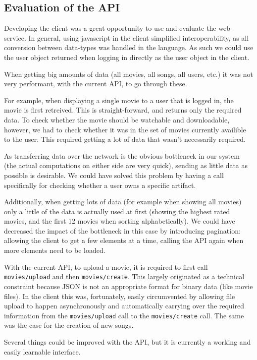 \subsection{Evaluation of the API}
\label{sec:evalapi}

Developing the client was a great opportunity to use and evaluate the web service. In general, using
javascript in the client simplified interoperability, as all conversion between data-types was handled
in the language. As such we could use the user object returned when logging in directly as the user
object in the client.

When getting big amounts of data (all movies, all songs, all users, etc.) it was not very performant,
with the current API, to go through these.

For example, when displaying a single movie to a user that
is logged in, the movie is first retreived. This is straight-forward, and returns only the required
data. To check whether the movie should be watchable and downloadable, however, we had to check whether
it was in the set of movies currently availible to the user. This required getting a lot of data that
wasn't necessarily required.

As transferring data over the network is the obvious bottleneck in our system (the actual computations
on either side are very quick), sending as little data as possible is desirable. We could have solved this
problem by having a call specifically for checking whether a user owns a specific artifact.

Additionally, when getting lots of data (for example when showing all movies) only a little of the data
is actually used at first (showing the highest rated movies, and the first 12 movies when sorting
alphabetically). We could have decreased the impact of the bottleneck in this case by introducing
pagination: allowing the client to get a few elements at a time, calling the API again when more elements
need to be loaded.

With the current API, to upload a movie, it is required to first call \verb+movies/upload+ and then
\verb+movies/create+. This largely originated as a technical constraint because JSON is not an appropriate
format for binary data (like movie files). In the client this was, fortunately, easily circumvented by
allowing file upload to happen asynchronously and automatically carrying over the required information
from the \verb+movies/upload+ call to the \verb+movies/create+ call. The same was the case for the creation
of new songs.

Several things could be improved with the API, but it is currently a working and easily learnable
interface.